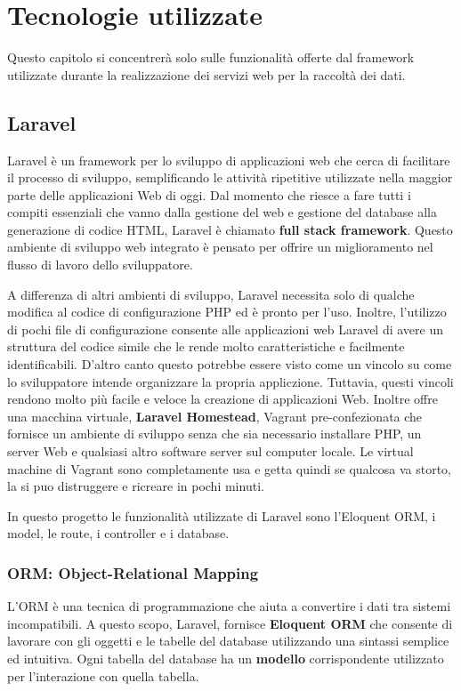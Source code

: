 \chapter{Tecnologie utilizzate}

Questo capitolo si concentrerà solo sulle funzionalità offerte dal framework utilizzate durante la realizzazione dei servizi web per la raccoltà dei dati.

\section{Laravel}
Laravel è un framework per lo sviluppo di applicazioni web che cerca di facilitare il processo di sviluppo, semplificando le attività ripetitive utilizzate nella maggior parte delle applicazioni Web di oggi.
Dal momento che riesce a fare tutti i compiti essenziali che vanno dalla gestione del web e gestione del database alla generazione di codice HTML, Laravel è chiamato \textbf{full stack framework}. Questo ambiente di sviluppo web integrato è pensato per offrire un miglioramento nel flusso di lavoro dello sviluppatore.

A differenza di altri ambienti di sviluppo, Laravel necessita solo di qualche modifica al codice di configurazione PHP ed è pronto per l'uso. Inoltre, l'utilizzo di pochi file di configurazione consente alle applicazioni web Laravel di avere un struttura del codice simile che le rende molto caratteristiche e facilmente identificabili. D'altro canto questo potrebbe essere visto come un vincolo su come lo sviluppatore intende organizzare la propria appliczione. Tuttavia, questi vincoli rendono molto più facile e veloce la creazione di applicazioni Web. Inoltre offre una macchina virtuale, \textbf{Laravel Homestead}, Vagrant pre-confezionata che fornisce un ambiente di sviluppo senza che sia necessario installare PHP, un server Web e qualsiasi altro software server sul computer locale. Le virtual machine di Vagrant sono completamente usa e getta quindi se qualcosa va storto, la si puo distruggere e ricreare in pochi minuti.

In questo progetto le funzionalità utilizzate di Laravel sono l'Eloquent ORM, i model, le route, i controller e i database.

\subsection{ORM: Object-Relational Mapping}
L'ORM è una tecnica di programmazione che aiuta a convertire i dati tra sistemi incompatibili.
A questo scopo, Laravel, fornisce \textbf{Eloquent ORM} che consente di lavorare con gli oggetti e le tabelle del database utilizzando una sintassi semplice ed intuitiva. Ogni tabella del database ha un \textbf{modello} corrispondente utilizzato per l'interazione con quella tabella. 

